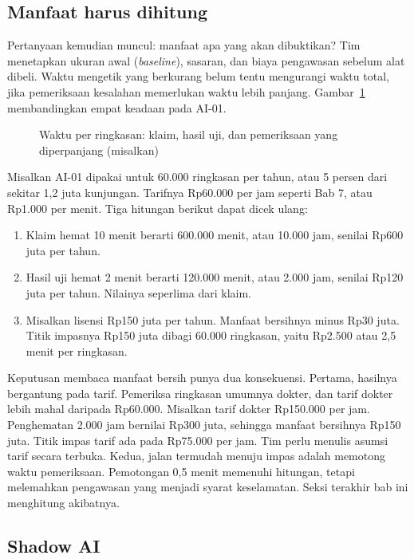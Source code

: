 \subsection*{Manfaat harus dihitung}

Pertanyaan kemudian muncul: manfaat apa yang akan dibuktikan? Tim menetapkan ukuran awal
(\textit{baseline}), sasaran, dan biaya pengawasan sebelum alat dibeli. Waktu mengetik yang
berkurang belum tentu mengurangi waktu total, jika pemeriksaan kesalahan memerlukan waktu lebih
panjang. Gambar~\ref{fig:ch11-waktu-bersih} membandingkan empat keadaan pada AI-01.

\begin{figure}[!htb]
  \centering
  
  \caption{Waktu per ringkasan: klaim, hasil uji, dan pemeriksaan yang diperpanjang (misalkan)}
  \label{fig:ch11-waktu-bersih}
\end{figure}

Misalkan AI-01 dipakai untuk 60.000 ringkasan per tahun, atau 5 persen dari sekitar 1,2 juta
kunjungan. Tarifnya Rp60.000 per jam seperti Bab 7, atau Rp1.000 per menit. Tiga hitungan berikut
dapat dicek ulang:
\begin{enumerate}
  \item Klaim hemat 10 menit berarti 600.000 menit, atau 10.000 jam, senilai Rp600 juta per tahun.
  \item Hasil uji hemat 2 menit berarti 120.000 menit, atau 2.000 jam, senilai Rp120 juta per
  tahun. Nilainya seperlima dari klaim.
  \item Misalkan lisensi Rp150 juta per tahun. Manfaat bersihnya minus Rp30 juta. Titik impasnya
  Rp150 juta dibagi 60.000 ringkasan, yaitu Rp2.500 atau 2,5 menit per ringkasan.
\end{enumerate}

Keputusan membaca manfaat bersih punya dua konsekuensi. Pertama, hasilnya bergantung pada tarif.
Pemeriksa ringkasan umumnya dokter, dan tarif dokter lebih mahal daripada Rp60.000. Misalkan tarif
dokter Rp150.000 per jam. Penghematan 2.000 jam bernilai Rp300 juta, sehingga manfaat bersihnya
Rp150 juta. Titik impas tarif ada pada Rp75.000 per jam. Tim perlu menulis asumsi tarif secara
terbuka. Kedua, jalan termudah menuju impas adalah memotong waktu pemeriksaan. Pemotongan 0,5
menit memenuhi hitungan, tetapi melemahkan pengawasan yang menjadi syarat keselamatan. Seksi
terakhir bab ini menghitung akibatnya.

\subsection*{Shadow AI}

